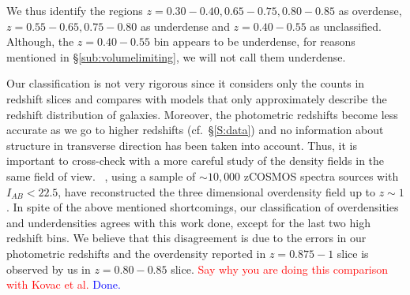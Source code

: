 \documentclass[twocolumn,useAMS,usenatbib]{mn2e}
\newcommand{\rachel}[1]{{\textcolor{red}{#1}}}
\newcommand{\arun}[1]{{\textcolor{blue}{#1}}}
\begin{document}
We thus identify the regions $z=0.30-0.40, 0.65-0.75, 0.80-0.85$ as overdense, $z=0.55-0.65, 0.75-0.80$ as underdense and $z=0.40-0.55$ as unclassified. Although, the $z=0.40-0.55$ bin
appears to be underdense, for reasons mentioned in \S\ref{sub:volumelimiting}, we will not call them underdense.

Our classification is not very rigorous since it considers only the counts in redshift slices and compares with models that only approximately describe the redshift distribution of galaxies.
Moreover, the photometric redshifts become less accurate as we go to higher redshifts (cf.~\S\ref{S:data}) and no information about structure in transverse direction has been taken into account.
Thus, it is important to cross-check with a more careful study of the density fields in the same field of view.
~\cite{Kovac_Density10k}, using a sample of $\sim 10,000$ zCOSMOS spectra sources with $I_{AB}<22.5$, have reconstructed the three dimensional overdensity field up to $z\sim 1$.
In spite of the above mentioned shortcomings, our classification of overdensities and underdensities agrees with this work done, except for the last two high redshift bins.
We believe that this disagreement is due to the errors in our photometric redshifts and the overdensity reported in $z=0.875-1$ slice
is observed by us in $z=0.80-0.85$ slice.
\rachel{Say why you are doing this comparison with Kovac et al.} \arun{Done.}
\end{document}

